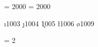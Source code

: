 \def\while#1#2{
  \ifnum #1
    #2%
    \while{#1}{#2}\fi
}

\countdef {}
\countdef {}
\countdef {}
\DStart = 2000
\DEnd = 2000
\def\getD#1#2{%
    \pos = #1%
    \advance \pos by \DStart%
    #2= \count \pos \relax%
}
\def\setD#1#2{%
    \pos = #1%
    \advance \pos by \DStart%
    \global \count \pos = #2\relax%
}

\countdef \i 1003
\countdef \j 1004
\countdef \k 1005
\countdef \l 1006
\countdef {}
\countdef {}
\countdef \o 1009

\countdef {}
\q = 2

%
%
\def\insert#1#2{
    {
        \i = \DStart\relax
        \while{\i < \DEnd}{
            \getD \i \j
            \ifnum \j = 0 \relax
                \setD{\i}{#1}
                \advance \i by 1
                \setD{\i}{#2}
                \i = \DEnd
                \advance \i by 1
            \else
                \advance \i by 2
            \fi
        }
        \ifnum \i = \DEnd \relax
            \setD{\i}{#1}
            \advance \i by 1
            \setD{\i}{#2}
            \global\advance\DEnd by 2
        \fi
    }
}

%
%
\def\foreach#1{
    \i = \DStart\relax
    \while{\i < \DEnd}{
        \getD \i \j
        \ifnum \j > 0 \relax
            \advance \i by 1
            \getD \i \k
            #1\j\k
            \advance \i by 1
        \else
            \advance \i by 2
        \fi
    }
}

%
\def\print{
    \def\printKeyValue##1##2{
        D[\the ##1] = \the ##2\newline
    }
    \foreach{\printKeyValue}
}

%
%
\def\delete#1{
    {
        \i = \DStart\relax
        \while{\i < \DEnd}{
            \getD \i \j
            \ifnum \j = #1 \relax
                \setD{\i}{0}
            \fi
            \advance \i by 2
        }
    }
}

